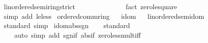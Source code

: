 \begin{isabellebody}
%
\endisatagproof
{\isafoldproof}%
%
\isadelimproof
%
\endisadelimproof
\isanewline
\isanewline
{}\isamarkupfalse%
\ linordered{\isacharunderscore}{\kern0pt}semiring{\isacharunderscore}{\kern0pt}{}{\isacharunderscore}{\kern0pt}strict\isanewline
%
\isadelimproof
%
\endisadelimproof
%
\isatagproof
{}\isamarkupfalse%
\isanewline
\ \ \isamarkupfalse%
\ {\isachardoublequoteopen}{}\ {\isasymle}\ {}\ {\isacharasterisk}{\kern0pt}\ {}{\isachardoublequoteclose}\isanewline
\ \ \ \ \isamarkupfalse%
\ {\isacharparenleft}{\kern0pt}fact\ zero{\isacharunderscore}{\kern0pt}le{\isacharunderscore}{\kern0pt}square{\isacharparenright}{\kern0pt}\isanewline
\ \ \isamarkupfalse%
\ \isamarkupfalse%
\ {\isachardoublequoteopen}{}\ {\isacharless}{\kern0pt}\ {}{\isachardoublequoteclose}\ \isanewline
\ \ \ \ \isamarkupfalse%
\ {\isacharparenleft}{\kern0pt}simp\ add{\isacharcolon}{\kern0pt}\ le{\isacharunderscore}{\kern0pt}less{\isacharparenright}{\kern0pt}\isanewline
{}\isamarkupfalse%
%
\endisatagproof
{\isafoldproof}%
%
\isadelimproof
\isanewline
%
\endisadelimproof
\isanewline
{}\isamarkupfalse%
\ ordered{\isacharunderscore}{\kern0pt}comm{\isacharunderscore}{\kern0pt}ring%
\isadelimproof
\ %
\endisadelimproof
%
\isatagproof
\isacommand{{\isachardot}{\kern0pt}{\isachardot}{\kern0pt}}\isamarkupfalse%
%
\endisatagproof
{\isafoldproof}%
%
\isadelimproof
%
\endisadelimproof
\isanewline
{}\isamarkupfalse%
\ idom%
\isadelimproof
\ %
\endisadelimproof
%
\isatagproof
\isacommand{{\isachardot}{\kern0pt}{\isachardot}{\kern0pt}}\isamarkupfalse%
%
\endisatagproof
{\isafoldproof}%
%
\isadelimproof
%
\endisadelimproof
\isanewline
\isanewline
{}\isamarkupfalse%
\ linordered{\isacharunderscore}{\kern0pt}semidom\isanewline
%
\isadelimproof
\ \ %
\endisadelimproof
%
\isatagproof
{}\isamarkupfalse%
\ standard\ simp%
\endisatagproof
{\isafoldproof}%
%
\isadelimproof
\isanewline
%
\endisadelimproof
\isanewline
{}\isamarkupfalse%
\ idom{\isacharunderscore}{\kern0pt}abs{\isacharunderscore}{\kern0pt}sgn\isanewline
%
\isadelimproof
\ \ %
\endisadelimproof
%
\isatagproof
{}\isamarkupfalse%
\ standard\isanewline
\ \ \ \ {\isacharparenleft}{\kern0pt}auto\ simp\ add{\isacharcolon}{\kern0pt}\ sgn{\isacharunderscore}{\kern0pt}if\ abs{\isacharunderscore}{\kern0pt}if\ zero{\isacharunderscore}{\kern0pt}less{\isacharunderscore}{\kern0pt}mult{\isacharunderscore}{\kern0pt}iff{\isacharparenright}{\kern0pt}%

\end{isabellebody}
